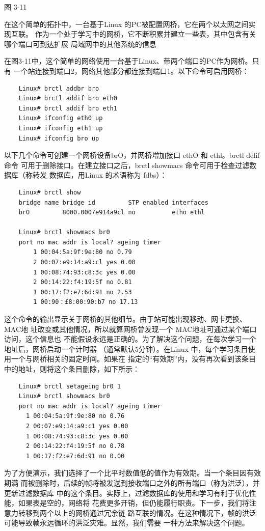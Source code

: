 图 3-11

在这个简单的拓扑中，一台基于Linux 的PC被配置网桥，它在两个以太网之间实现互联。
作为一个处于学习中的网桥，它不断积累并建立一些表，其中包含有关哪个端口可到达扩展
局域网中的其他系统的信息

在图3-11中，这个简单的网络使用一台基于Linux、带两个端口的PC作为网桥。只有
一个站连接到端口2，网络其他部分都连接到端口1。以下命令可启用网桥：
\begin{verbatim}
    Linux# brctl addbr bro
    Linux# brctl addif bro eth0
    Linux# brctl addif bro eth1
    Linux# ifconfig eth0 up
    Linux# ifconfig eth1 up
    Linux# ifconfig bro up
\end{verbatim}

以下几个命令可创建一个网桥设备brO，并网桥增加接口 ethO 和 ethl。brctl delif 命令
可用于删除接口。在建立接口之后，brctl showmacs 命令可用于检查过滤数据库（称转发
数据库，用Linux 的术语称为 fdbs）：

\begin{verbatim}
    Linux# brctl show
    bridge name bridge id         STP enabled interfaces
    brO         8000.0007e914a9cl no          etho ethl

    Linux# brctl showmacs br0
    port no mac addr is local? ageing timer
        1 00:04:5a:9f:9e:80 no 0.79
        2 00:07:e9:14:a9:cl yes 0.00
        1 00:08:74:93:c8:3c yes 0.00
        2 00:14:22:f4:19:5f no 0.81
        1 00:17:f2:e7:6d:91 no 2.53
        1 00:90：£8:00:90:b7 no 17.13
\end{verbatim}

这个命令的输出显示关于网桥的其他细节。由于站可能出现移动、网卡更换、MAC地
址改变或其他情况，所以就算网桥曾发现一个 MAC地址可通过某个端口访问，这个信息也
不能假设永远是正确的。为了解决这个问题，在每次学习一个地址后，网桥启动一个计时器
（通常默认5分钟）。在Linux 中，每个学习条目使用一个与网桥相关的固定时间。如果在
指定的“有效期”内，没有再次看到该条目中的地址，则将这个条目删除，如下所示：

\begin{verbatim}
    Linux# brctl setageing br0 1
    Linux# brctl showmacs br0
    port no mac addr is local? ageing timer
      1 00:04:5a:9f:9e:80 no 0.76
      2 00:07:e9:14:a9:c1 yes 0.00
      1 00:08:74:93:c8:3c yes 0.00
      2 00:14:22:f4:19:5f no 0.78
      1 00:17:f2:e7:6d:91 no 0.00
\end{verbatim}

为了方便演示，我们选择了一个比平时数值低的值作为有效期。当一个条目因有效期满
而被删除时，后续的帧将被发送到接收端口之外的所有端口（称为洪泛），并更新过滤数据库
中的这个条目。实际上，过滤数据库的使用和学习有利于优化性能，如果表是空的，网络将
花费更多开销，但仍能履行职责。下一步，我们将注意力转移到两个以上的网桥通过冗余链
路互联的情况。在这种情况下，帧的洪泛可能导致帧永远循环的洪泛灾难。显然，我们需要
一种方法来解决这个问题。

